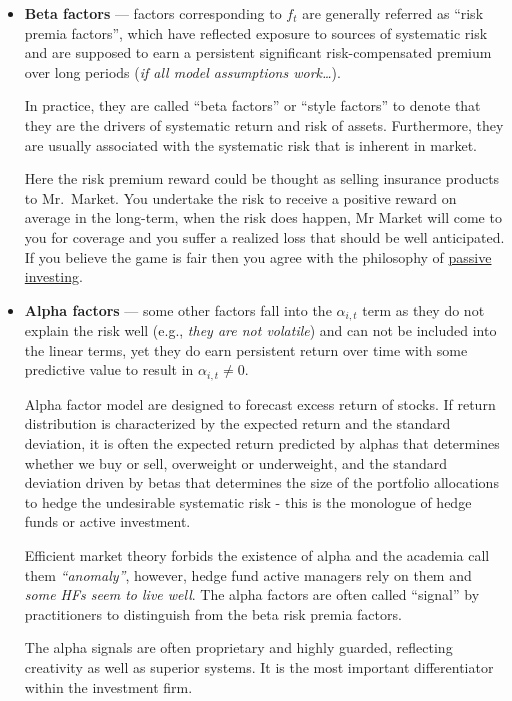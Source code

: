 \documentclass[
]{book}
\begin{document}
\begin{itemize}
\item
  {\textbf{Beta factors}} --- factors corresponding to \(f_t\) are generally referred as ``risk premia factors'', which have reflected exposure to sources of systematic risk and are supposed to earn a persistent significant risk-compensated premium over long periods ({\emph{if all model assumptions work\ldots{}}}).

  In practice, they are called ``beta factors'' or ``style factors'' to denote that they are the drivers of systematic return and risk of assets. Furthermore, they are usually associated with the systematic risk that is inherent in market.

  Here the risk premium reward could be thought as selling insurance products to Mr.~Market. You undertake the risk to receive a positive reward on average in the long-term, when the risk does happen, Mr Market will come to you for coverage and you suffer a realized loss that should be well anticipated. If you believe the game is fair then you agree with the philosophy of \href{https://www.investopedia.com/terms/p/passiveinvesting.asp}{passive investing}.
\item
  {\textbf{Alpha factors}} --- some other factors fall into the \(\alpha_{i,t}\) term as they do not explain the risk well (e.g., {\emph{they are not volatile}}) and can not be included into the linear terms, yet they do earn persistent return over time with some predictive value to result in \(\alpha_{i,t} \neq 0\).

  Alpha factor model are designed to forecast excess return of stocks. If return distribution is characterized by the expected return and the standard deviation, it is often the expected return predicted by alphas that determines whether we buy or sell, overweight or underweight, and the standard deviation driven by betas that determines the size of the portfolio allocations to hedge the undesirable systematic risk - this is the monologue of hedge funds or active investment.

  Efficient market theory forbids the existence of alpha and the academia call them {\emph{``anomaly''}}, however, hedge fund active managers rely on them and {\emph{some HFs seem to live well}}. The alpha factors are often called ``signal'' by practitioners to distinguish from the beta risk premia factors.

  The alpha signals are often proprietary and highly guarded, reflecting creativity as well as superior systems. It is the most important differentiator within the investment firm.
\end{itemize}
\end{document}
